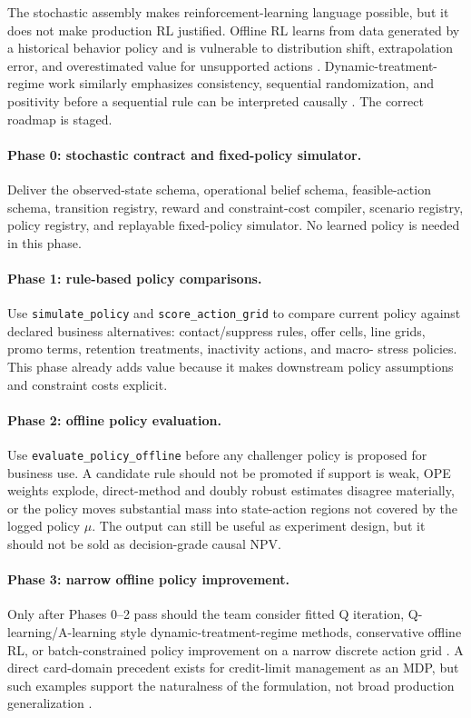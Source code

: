 \documentclass[11pt]{article}
\newcommand{\1}{\mathbf{1}}
\newcommand{\code}[1]{\nolinkurl{#1}}
\begin{document}
The stochastic assembly makes reinforcement-learning language possible, but it
does not make production RL justified. Offline RL learns from data generated by a
historical behavior policy and is vulnerable to distribution shift,
extrapolation error, and overestimated value for unsupported actions
\citep{levine2020offline,fujimoto2019bcq,kumar2020cql}. Dynamic-treatment-regime
work similarly emphasizes consistency, sequential randomization, and positivity
before a sequential rule can be interpreted causally
\citep{murphy2003dynamic,schulte2014qlearning,laber2010inference}. The correct
roadmap is staged.

\paragraph{Phase 0: stochastic contract and fixed-policy simulator.}
Deliver the observed-state schema, operational belief schema, feasible-action
schema, transition registry, reward and constraint-cost compiler, scenario
registry, policy registry, and replayable fixed-policy simulator. No learned
policy is needed in this phase.

\paragraph{Phase 1: rule-based policy comparisons.}
Use \code{simulate_policy} and \code{score_action_grid} to compare current policy
against declared business alternatives: contact/suppress rules, offer cells,
line grids, promo terms, retention treatments, inactivity actions, and macro-
stress policies. This phase already adds value because it makes downstream
policy assumptions and constraint costs explicit.

\paragraph{Phase 2: offline policy evaluation.}
Use \code{evaluate_policy_offline} before any challenger policy is proposed for
business use. A candidate rule should not be promoted if support is weak, OPE
weights explode, direct-method and doubly robust estimates disagree materially,
or the policy moves substantial mass into state-action regions not covered by
the logged policy $\mu$. The output can still be useful as experiment design,
but it should not be sold as decision-grade causal NPV.

\paragraph{Phase 3: narrow offline policy improvement.}
Only after Phases 0--2 pass should the team consider fitted Q iteration,
Q-learning/A-learning style dynamic-treatment-regime methods, conservative
offline RL, or batch-constrained policy improvement on a narrow discrete action
grid \citep{ernst2005fqi,schulte2014qlearning,laroche2019spibb,
fujimoto2019bcq,kumar2020cql}. A direct card-domain precedent exists for
credit-limit management as an MDP, but such examples support the naturalness of
the formulation, not broad production generalization
\citep{trench2003bankone,alfonsosanchez2024creditlimit}.
\end{document}
